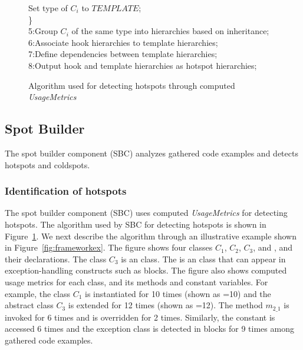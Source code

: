 \begin{figure}[t]
\begin{CodeOut}
\hspace*{0.5in}Set type of $C_i$ to $TEMPLATE$;\\
\hspace*{0.2in}\}\\
5:Group $C_i$ of the same type into hierarchies based on inheritance;\\
6:Associate hook hierarchies to template hierarchies;\\
7:Define dependencies between template hierarchies;\\
8:Output hook and template hierarchies as hotspot hierarchies;\\
\end{CodeOut}
\caption{\small{Algorithm used for detecting hotspots through computed
\emph{UsageMetrics}}} \label{alg:hotspotalgo}
\end{figure}
\subsection{Spot Builder} 
The spot builder component (SBC) analyzes gathered code examples and detects 
hotspots and coldspots.
\subsubsection{Identification of hotspots}
The spot builder component (SBC) uses computed \emph{UsageMetrics} for
detecting hotspots. The algorithm used by SBC for detecting hotspots
is shown in Figure~\ref{alg:hotspotalgo}. We next describe the algorithm 
through an illustrative example shown in Figure~\ref{fig:frameworkex}. The figure
shows four classes $C_1$, $C_2$, $C_3$, and , and their declarations. 
The class $C_3$ is an  class. The 
is an  class that can appear in exception-handling
constructs such as  blocks. The figure also shows
computed usage metrics for each class, and its methods and constant variables. For example,
the class $C_1$ is instantiated for 10 times (shown as =10)
and the abstract class $C_3$ is extended for 12 times (shown as =12). 
The method $m_{2\_1}$ is invoked for 6 times and is overridden for 2 times.
Similarly, the constant  is accessed 6 times and the 
exception class  is detected in  blocks
for 9 times among gathered code examples.

